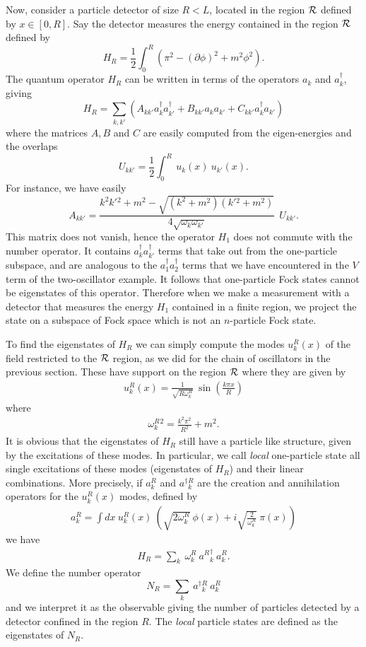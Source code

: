 \documentclass[11pt, nofootinbib]{revtex4-2}
\newcommand{\be}{\begin{equation}}
\newcommand{\ee}{\end{equation}}
\newcommand{\bea}{\begin{eqnarray}}
\newcommand{\eea}{\end{eqnarray}}
\begin{document}
Now, consider a particle detector of size $R<L$, located in the
region $\cal R$ defined by $x\in [0,R]$.  Say the detector measures
the energy contained in the region $\cal R$ defined by
%
\be 
H_{R} = \frac{1}{2} \int_{0}^{R}
\left(\pi^2-(\partial\phi)^2+m^2\phi^2 \right).  
\ee
%
The quantum operator $H_{R}$ can be written in terms of the 
operators $a_{k}$ and $a^\dagger_{k}$, giving 
%
\be 
H_{R} = \sum_{k,k'} (A_{kk'} a^\dagger_{k}a^\dagger_{k'}+
B_{kk'} a_{k}a_{k'}+
C_{kk'} a^\dagger_{k}a_{k'})
\ee
%
where the matrices $A, B$ and $C$ are easily computed from the 
eigen-energies and the overlaps
%
\be 
U_{kk'} =  \frac{1}{2} \int_{0}^{R} \ u_{k}(x)   \ u_{k'}(x).   
\ee
%
For instance, we have easily
%
\be 
A_{kk'} = \frac{k^2k'{}^2+m^2-\sqrt{(k^2+m^2)(k'{}^2+m^2)}}
{4\sqrt{\omega_{k}\omega_{k'}}}\ \  U_{kk'} .   
\ee
%
This matrix does not vanish, hence the operator $H_{1}$ does not
commute with the number operator.  It contains $
a^\dagger_{k}a^\dagger_{k'}$ terms that take out from the one-particle
subspace, and are analogous to the $ a^\dagger_{1}a^\dagger_{2}$
terms that we have encountered in the $V$ term of the two-oscillator
example.  It follows that one-particle Fock states cannot be
eigenstates of this operator.  Therefore when we make a measurement
with a detector that measures the energy $H_{1}$ contained in a finite
region, we project the state on a subspace of Fock space which is not
an $n$-particle Fock state.  

To find the eigenstates of $H_{R}$ we can simply compute the modes
$u^{R}_{k}(x)$ of the field restricted to the $\cal R$ region, as we
did for the chain of oscillators in the previous section.  These have
support on the region $\cal R$ where they are given by
%
\bea 
u^{R}_{k}(x)= \frac{1}{\sqrt{R \omega^{R}_{k}}} \  
\sin \left( \frac{k \pi x}{R}
\right)
\eea
%
where
%
\bea \omega^{R}_{k}{}^2 = \frac{k^2 \pi^2}{R^2} + m^2.  \eea
%
It is obvious that the eigenstates of $H_{R}$ still
have a particle like structure, given by the excitations of these
modes.  In particular, we call \emph{local} one-particle state all
single excitations of these modes (eigenstates of $H_{R}$) and their
linear combinations.  More precisely, if $a^{R}_{k}$ and
$a^\dagger{}^{R}_{k}$ are the creation and annihilation operators
for the  $u^{R}_{k}(x)$ modes, defined by 
%
\bea 
a^R_{k} = \int dx\ u^R_{k}(x) \ \left( \sqrt{2\omega^R_{k}}\ \phi(x)+i
\sqrt{\frac{2}{\omega^R_{k}}}\ \pi(x)\right)
\eea
%
we have 
%
\bea 
H_R =  \sum_{k}\ \omega^R_{k}\ a^R{}^\dagger_{k}\ a^R_{k}.
\eea
%
We define the number operator
%
\be 
N_{R}= \sum_{k} \ a^\dagger{}^{R}_{k}\  a^{R}_{k}
\ee
%
and we interpret it as the observable giving the number of particles
detected by a detector confined in the region $R$.  The \emph{local}
particle states are defined as the eigenstates of $N_{R}$. 
\end{document}
